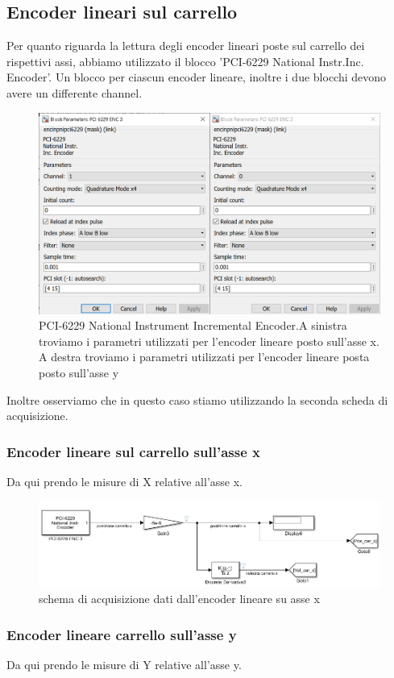 \documentclass{article}
\begin{document}
\subsection{Encoder lineari sul carrello}
Per quanto riguarda la lettura degli encoder lineari poste sul carrello dei rispettivi assi, abbiamo utilizzato il blocco 'PCI-6229 National Instr.Inc. Encoder'. Un blocco per ciascun encoder lineare, inoltre i due blocchi devono avere un differente channel.
\begin{figure}[H]
\centering
\includegraphics[width=.6\textwidth]{./simulink_real/pbandaxy.png}
\caption{PCI-6229 National Instrument Incremental Encoder.A sinistra troviamo i parametri utilizzati per l'encoder lineare posto sull'asse x. A destra troviamo i parametri utilizzati per l'encoder lineare posta posto sull'asse y}
\end{figure}
Inoltre osserviamo che in questo caso stiamo utilizzando la seconda scheda di acquisizione.

\subsubsection{Encoder lineare sul carrello sull'asse x}
Da qui prendo le misure di X relative all'asse x.

\begin{figure}[H]
\centering
\includegraphics[width=.8\textwidth]{./simulink_real/bandax.png}
\caption{schema di acquisizione dati dall'encoder lineare su asse x}
\end{figure}

\subsubsection{Encoder lineare  carrello sull'asse y}
Da qui prendo le misure di Y relative all'asse y.
\end{document}
